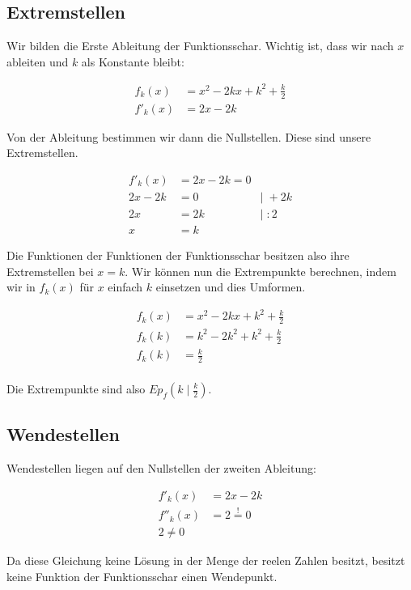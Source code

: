 \documentclass[12pt,a4paper]{article}
\begin{document}
\subsection{Extremstellen}

Wir bilden die Erste Ableitung der Funktionsschar. Wichtig ist, dass wir nach $x$ ableiten und $k$ als Konstante bleibt:

$$
\begin{aligned}
    f_k(x) &= x^2 - 2kx + k^2 + \frac{k}{2} \\
    f'_k(x) &= 2x - 2k
\end{aligned}
$$

Von der Ableitung bestimmen wir dann die Nullstellen. Diese sind unsere Extremstellen.

$$
\begin{aligned}
    f'_k(x) &= 2x - 2k = 0 \\
    2x - 2k &= 0 &|\; + 2k \\
    2x &= 2k &| \; :2 \\
    x &= k
\end{aligned}
$$

Die Funktionen der Funktionen der Funktionsschar besitzen also ihre Extremstellen bei $x = k$. Wir können nun die Extrempunkte berechnen, indem wir in $f_k(x)$ für $x$ einfach $k$ einsetzen und dies Umformen.

$$
\begin{aligned}
    f_k(x)&= x^2 - 2kx + k^2 + \frac{k}{2} \\
    f_k(k)&= k^2 - 2k^2 + k^2 + \frac{k}{2} \\
    f_k(k)&= \frac{k}{2} \\
\end{aligned}
$$

Die Extrempunkte sind also $Ep_f(k \mid \frac{k}{2})$.

\subsection{Wendestellen}

Wendestellen liegen auf den Nullstellen der zweiten Ableitung:

$$
\begin{aligned}
    f'_k(x) &= 2x - 2k \\
    f''_k(x) &= 2 \overset{!}{=} 0 \\
    2 \ne 0
\end{aligned}
$$

Da diese Gleichung keine Lösung in der Menge der reelen Zahlen besitzt, besitzt keine Funktion der Funktionsschar einen Wendepunkt.
\end{document}
